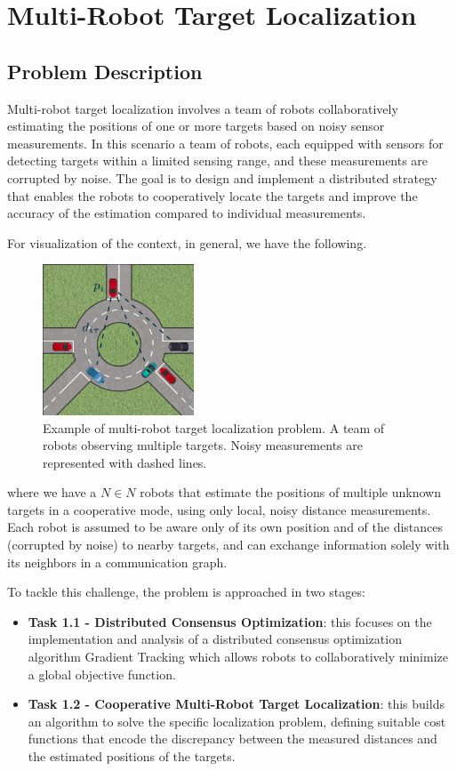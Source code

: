 \chapter{Multi-Robot Target Localization}


\section*{Problem Description}

Multi-robot target localization involves a team of robots collaboratively estimating the positions of one or more targets based on noisy
 sensor measurements. In this scenario a team of robots, each equipped with sensors for detecting targets within a limited sensing range, 
 and these measurements are corrupted by noise. 
The goal is to design and implement a distributed strategy that enables the robots to cooperatively locate the targets and improve the accuracy 
of the estimation compared to individual measurements.


For visualization of the context, in general, we have the following.
\begin{figure}[h]
    \centering
    \includegraphics[width=0.4\textwidth]{img/Cap1/multi_robot_localization.png}
    \caption{Example of multi-robot target localization problem. A team of robots observing multiple targets. Noisy measurements are represented with dashed lines.}
    \label{fig:multi_robot_localization}
\end{figure}

where we have a $N \in N $ robots that estimate the positions of multiple unknown targets in a cooperative mode, using only local, noisy distance measurements. 
Each robot is assumed to be aware only of its own position and of the distances (corrupted by noise) to nearby targets, and can exchange information solely with 
its neighbors in a communication graph.


To tackle this challenge, the problem is approached in two stages:
\begin{itemize}
    \item \textbf{Task 1.1 - Distributed Consensus Optimization}: this focuses on the implementation and analysis of a distributed consensus optimization algorithm Gradient Tracking
     which allows robots to collaboratively minimize a global objective function.
    \item \textbf{Task 1.2 - Cooperative Multi-Robot Target Localization}: this builds an algorithm to solve the specific localization problem, defining suitable cost functions that
     encode the discrepancy between the measured distances and the estimated positions of the targets.
\end{itemize}

